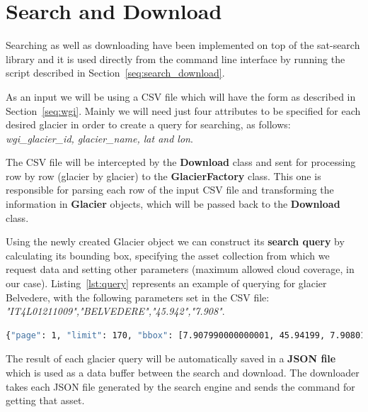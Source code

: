 \documentclass[12pt, a4paper]{report}
\begin{document}
		
	\section{Search and Download}
	\label{seq:sd_implementation}
		
	\par Searching as well as downloading have been implemented on top of the sat-search library and it is used directly from the command line interface by running the script described in Section~\ref{seq:search_download}.
	
	\par As an input we will be using a CSV file which will have the form as described in Section~\ref{seq:wgi}. Mainly we will need just four attributes to be specified for each desired glacier in order to create a query for searching, as follows: \textit{wgi\_glacier\_id, glacier\_name, lat and lon}.
	
	\par The CSV file will be intercepted by the \textbf{Download } class and sent for processing row by row (glacier by glacier) to the \textbf{GlacierFactory} class. This one is responsible for parsing each row of the input CSV file and transforming the information in \textbf{Glacier} objects, which will be passed back to the \textbf{Download} class.
	
	\par Using the newly created Glacier object we can construct its \textbf{search query} by calculating its bounding box, specifying the asset collection from which we request data and setting other parameters (maximum allowed cloud coverage, in our case). Listing~\ref{lst:query} represents an example of querying for glacier Belvedere, with the following parameters set in the CSV file: \textit{"IT4L01211009","BELVEDERE","45.942","7.908"}.
	
	\begin{lstlisting}[caption={Search query created by sat-search},label={lst:query},language=Bash]
		{"page": 1, "limit": 170, "bbox": [7.907990000000001, 45.94199, 7.90801, 45.94201], "query": {"eo:cloud_cover": {"lt": 10}}, "collection": "landsat-8-l1"}
	\end{lstlisting}

	\par The result of each glacier query will be automatically saved in a \textbf{JSON file} which is used as a data buffer between the search and download. The downloader takes each JSON file generated by the search engine and sends the command for getting that asset.
	
\end{document}
